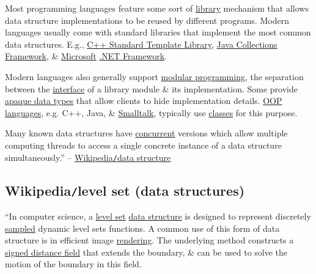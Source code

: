 \documentclass{article}
\begin{document}
Most programming languages feature some sort of \href{https://en.wikipedia.org/wiki/Library_(computing)}{library} mechanism that allows data structure implementations to be reused by different programs. Modern languages usually come with standard libraries that implement the most common data structures. E.g., \href{https://en.wikipedia.org/wiki/Standard_Template_Library}{C++ Standard Template Library}, \href{https://en.wikipedia.org/wiki/Java_Collections_Framework}{Java Collections Framework}, \& \href{https://en.wikipedia.org/wiki/Microsoft}{Microsoft} \href{https://en.wikipedia.org/wiki/.NET_Framework}{.NET Framework}.

Modern languages also generally support \href{https://en.wikipedia.org/wiki/Modular_programming}{modular programming}, the separation between the \href{https://en.wikipedia.org/wiki/Interface_(computing)}{interface} of a library module \& its implementation. Some provide \href{https://en.wikipedia.org/wiki/Opaque_data_type}{apaque data types} that allow clients to hide implementation details. \href{https://en.wikipedia.org/wiki/Object-oriented_programming_language}{OOP languages}, e.g. C++, Java, \& \href{https://en.wikipedia.org/wiki/Smalltalk}{Smalltalk}, typically use \href{https://en.wikipedia.org/wiki/Classes_(computer_science)}{classes} for this purpose.

Many known data structures have \href{https://en.wikipedia.org/wiki/Concurrent_data_structure}{concurrent} versions which allow multiple computing threads to access a single concrete instance of a data structure simultaneously.'' -- \href{https://en.wikipedia.org/wiki/Data_structure}{Wikipedia{\tt/}data structure}


\subsection{Wikipedia{\tt/}level set (data structures)}
``In computer science, a \href{https://en.wikipedia.org/wiki/Level_set}{level set} \href{https://en.wikipedia.org/wiki/Data_structure}{data structure} is designed to represent discretely \href{https://en.wikipedia.org/wiki/Sampling_(statistics)}{sampled} dynamic level sets functions. A common use of this form of data structure is in efficient image \href{https://en.wikipedia.org/wiki/Rendering_(computer_graphics)}{rendering}. The underlying method constructs a \href{https://en.wikipedia.org/wiki/Distance_transform}{signed distance field} that extends the boundary, \& can be used to solve the motion of the boundary in this field.
\end{document}
